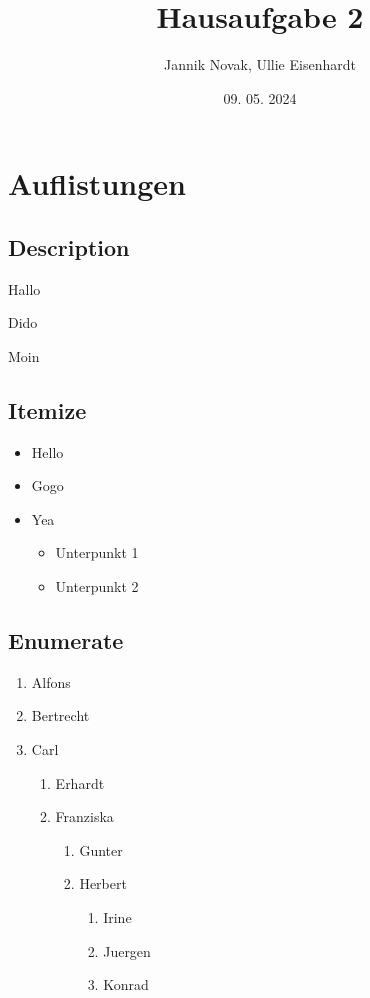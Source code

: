 \documentclass{article}
\title{Hausaufgabe 2}
\author{Jannik Novak, Ullie Eisenhardt}
\date{09. 05. 2024}
\begin{document}
\maketitle

\clearpage

\tableofcontents

\clearpage

\section{Auflistungen}

\subsection{Description}

\begin{description}
    \item Hallo
    \item Dido
    \item Moin
\end{description}

\subsection{Itemize}

\begin{itemize}
    \item Hello
    \item Gogo
    \item Yea
    \begin{itemize}
        \item Unterpunkt 1
        \item Unterpunkt 2
    \end{itemize}
\end{itemize}

\subsection{Enumerate}

\begin{enumerate}
    \item Alfons
    \item Bertrecht
    \item Carl
    \begin{enumerate}
        \item Erhardt
        \item Franziska
        \begin{enumerate}
            \item Gunter
            \item Herbert
            \begin{enumerate}
                \item Irine
                \item Juergen
                \item Konrad
            \end{enumerate}
        \end{enumerate}
    \end{enumerate}
\end{enumerate}
\end{document}
